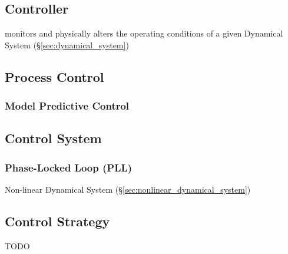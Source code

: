 \subsection{Controller}\label{sec:controller}


monitors and physically alters the operating conditions of a given
Dynamical System (\S\ref{sec:dynamical_system})



\subsection{Process Control}\label{sec:process_control}

\subsubsection{Model Predictive Control}\label{sec:model_predictive_control}



\subsection{Control System}\label{sec:control_system}

\subsubsection{Phase-Locked Loop (PLL)}\label{sec:pll}

Non-linear Dynamical System (\S\ref{sec:nonlinear_dynamical_system})



\subsection{Control Strategy}\label{sec:control_strategy}

TODO



